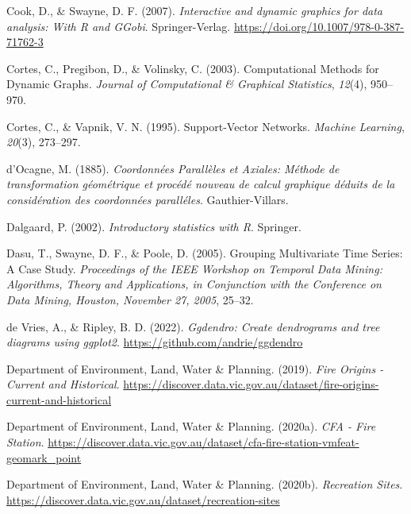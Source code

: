 \documentclass[
  letterpaper,
]{book}
\newlength{\cslhangindent}
\newlength{\cslentryspacingunit} %
\newenvironment{CSLReferences}[2] %
 {%
  \setlength{\parindent}{0pt}
  \ifodd #1
  \let\oldpar\par
  \def\par{\hangindent=\cslhangindent\oldpar}
  \fi
  \setlength{\parskip}{#2\cslentryspacingunit}
 }%
 {}
\begin{document}
\begin{CSLReferences}{1}{0}
\leavevmode{}%
Cook, D., \& Swayne, D. F. (2007). \emph{Interactive and dynamic
graphics for data analysis: With {R} and {GGobi}}. Springer-Verlag.
\url{https://doi.org/10.1007/978-0-387-71762-3}

\leavevmode{}%
Cortes, C., Pregibon, D., \& Volinsky, C. (2003). Computational
{M}ethods for {D}ynamic {G}raphs. \emph{Journal of Computational \&
Graphical Statistics}, \emph{12}(4), 950--970.

\leavevmode{}%
Cortes, C., \& Vapnik, V. N. (1995). Support-{V}ector {N}etworks.
\emph{Machine Learning}, \emph{20}(3), 273--297.

\leavevmode{}%
d'Ocagne, M. (1885). \emph{{C}oordonnées {P}arallèles et {A}xiales:
{M}éthode de transformation géométrique et procédé nouveau de calcul
graphique déduits de la considération des coordonnées paralléles}.
Gauthier-Villars.

\leavevmode{}%
Dalgaard, P. (2002). \emph{Introductory statistics with {R}}. Springer.

\leavevmode{}%
Dasu, T., Swayne, D. F., \& Poole, D. (2005). Grouping {M}ultivariate
{T}ime {S}eries: A {C}ase {S}tudy. \emph{Proceedings of the IEEE
Workshop on {T}emporal {D}ata {M}ining: {A}lgorithms, {T}heory and
{A}pplications, in Conjunction with the Conference on Data Mining,
Houston, November 27, 2005}, 25--32.

\leavevmode{}%
de Vries, A., \& Ripley, B. D. (2022). \emph{Ggdendro: Create
dendrograms and tree diagrams using ggplot2}.
\url{https://github.com/andrie/ggdendro}

\leavevmode{}%
Department of Environment, Land, Water \& Planning. (2019). \emph{{Fire
Origins - Current and Historical}}.
\url{https://discover.data.vic.gov.au/dataset/fire-origins-current-and-historical}

\leavevmode{}%
Department of Environment, Land, Water \& Planning. (2020a). \emph{{CFA
- Fire Station}}.
\url{https://discover.data.vic.gov.au/dataset/cfa-fire-station-vmfeat-geomark_point}

\leavevmode{}%
Department of Environment, Land, Water \& Planning. (2020b).
\emph{{Recreation Sites}}.
\url{https://discover.data.vic.gov.au/dataset/recreation-sites}


\end{CSLReferences}
\end{document}
